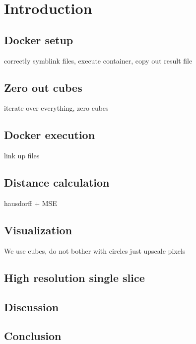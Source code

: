 \section{Introduction}

\subsection{Docker setup}
correctly symblink files, execute container, copy out result file

\subsection{Zero out cubes}
iterate over everything, zero cubes

\subsection{Docker execution}
link up files

\subsection{Distance calculation}
hausdorff + MSE

\subsection{Visualization}
We use cubes, do not bother with circles just upscale pixels

\subsection{High resolution single slice}

\subsection{Discussion}


\subsection{Conclusion}
